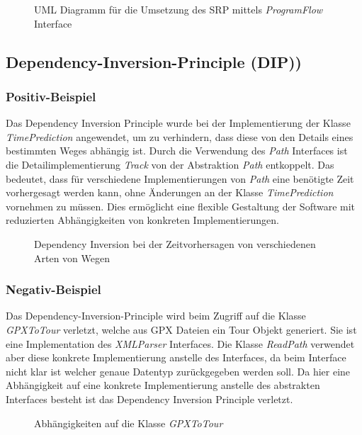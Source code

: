 \begin{figure}[H]
  \centering
  
  \caption{UML Diagramm für die Umsetzung des SRP mittels \textit{ProgramFlow} Interface}
\end{figure}


\subsection{Dependency-Inversion-Principle (DIP))}

\subsubsection{Positiv-Beispiel}

Das Dependency Inversion Principle wurde bei der Implementierung der Klasse \textit{TimePrediction} angewendet, um zu verhindern, dass diese von den Details eines bestimmten Weges abhängig ist.
Durch die Verwendung des \textit{Path} Interfaces ist die Detailimplementierung \textit{Track} von der Abstraktion \textit{Path} entkoppelt.
Das bedeutet, dass für verschiedene Implementierungen von \textit{Path} eine benötigte Zeit vorhergesagt werden kann, ohne Änderungen an der Klasse \textit{TimePrediction} vornehmen zu müssen.
Dies ermöglicht eine flexible Gestaltung der Software mit reduzierten Abhängigkeiten von konkreten Implementierungen.

\begin{figure}[H]
  \centering
  
  \caption{Dependency Inversion bei der Zeitvorhersagen von verschiedenen Arten von Wegen}
\end{figure}

\subsubsection{Negativ-Beispiel}

Das Dependency-Inversion-Principle wird beim Zugriff auf die Klasse \textit{GPXToTour} verletzt, welche aus GPX Dateien ein Tour Objekt generiert.
Sie ist eine Implementation des  \textit{XMLParser} Interfaces.
Die Klasse \textit{ReadPath} verwendet aber diese konkrete Implementierung anstelle des Interfaces, da beim Interface nicht klar ist welcher genaue Datentyp zurückgegeben werden soll. 
Da hier eine Abhängigkeit auf eine konkrete Implementierung anstelle des abstrakten Interfaces besteht ist das Dependency Inversion Principle verletzt.

\begin{figure}[H]
  \centering
  
  \caption{Abhängigkeiten auf die Klasse  \textit{GPXToTour}}
\end{figure}


